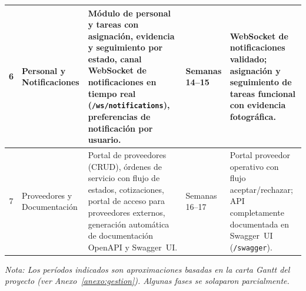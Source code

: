 \begin{longtable}{|c|p{}|p{}|p{}|p{}|}
6 & Personal y Notificaciones &
Módulo de personal y tareas con asignación, evidencia y seguimiento por estado, canal WebSocket de notificaciones en tiempo real (\texttt{/ws/notifications}), preferencias de notificación por usuario. &
Semanas 14--15 &
WebSocket de notificaciones validado; asignación y seguimiento de tareas funcional con evidencia fotográfica. \\
\hline

7 & Proveedores y Documentación &
Portal de proveedores (CRUD), órdenes de servicio con flujo de estados, cotizaciones, portal de acceso para proveedores externos, generación automática de documentación OpenAPI y Swagger~UI. &
Semanas 16--17 &
Portal proveedor operativo con flujo aceptar/rechazar; API completamente documentada en Swagger~UI (\texttt{/swagger}). \\

\end{longtable}

\textit{Nota: Los períodos indicados son aproximaciones basadas en la carta Gantt del proyecto (ver Anexo~\ref{anexo:gestion}). Algunas fases se solaparon parcialmente.}


